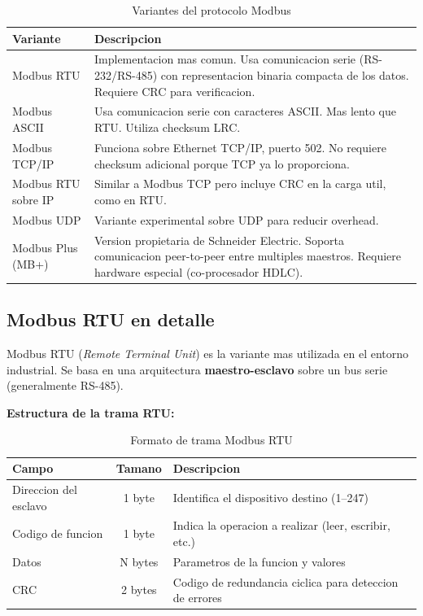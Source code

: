 \begin{table}[H]
    \centering
    \caption{Variantes del protocolo Modbus}
    \label{tab:modbus_variantes}
    \begin{tabular}{|l|p{8cm}|}
        \hline
        \textbf{Variante} & \textbf{Descripcion} \\
        \hline
        Modbus RTU & Implementacion mas comun. Usa comunicacion serie (RS-232/RS-485)
        con representacion binaria compacta de los datos. Requiere CRC para
        verificacion. \\
        \hline
        Modbus ASCII & Usa comunicacion serie con caracteres ASCII. Mas lento que
        RTU. Utiliza checksum LRC. \\
        \hline
        Modbus TCP/IP & Funciona sobre Ethernet TCP/IP, puerto 502. No requiere
        checksum adicional porque TCP ya lo proporciona. \\
        \hline
        Modbus RTU sobre IP & Similar a Modbus TCP pero incluye CRC en la carga
        util, como en RTU. \\
        \hline
        Modbus UDP & Variante experimental sobre UDP para reducir overhead. \\
        \hline
        Modbus Plus (MB+) & Version propietaria de Schneider Electric. Soporta
        comunicacion peer-to-peer entre multiples maestros. Requiere hardware
        especial (co-procesador HDLC). \\
        \hline
    \end{tabular}
\end{table}

\subsection{Modbus RTU en detalle}

Modbus RTU (\textit{Remote Terminal Unit}) es la variante mas utilizada en el
entorno industrial. Se basa en una arquitectura \textbf{maestro-esclavo} sobre
un bus serie (generalmente RS-485).

\textbf{Estructura de la trama RTU:}

\begin{table}[H]
    \centering
    \caption{Formato de trama Modbus RTU}
    \label{tab:modbus_trama}
    \begin{tabular}{|l|c|p{6cm}|}
        \hline
        \textbf{Campo} & \textbf{Tamano} & \textbf{Descripcion} \\
        \hline
        Direccion del esclavo & 1 byte & Identifica el dispositivo destino (1--247) \\
        \hline
        Codigo de funcion & 1 byte & Indica la operacion a realizar (leer, escribir, etc.) \\
        \hline
        Datos & N bytes & Parametros de la funcion y valores \\
        \hline
        CRC & 2 bytes & Codigo de redundancia ciclica para deteccion de errores \\
        \hline
    \end{tabular}
\end{table}

